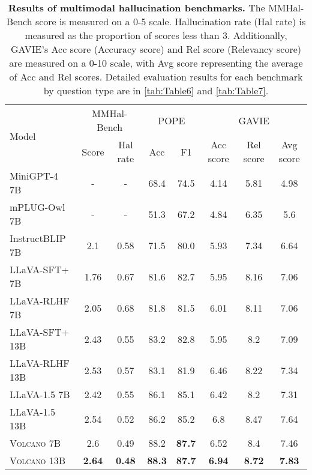 \documentclass[11pt]{article}
\newcommand{\Ours}{\textsc{Volcano}}
\begin{document}
\begin{table*}[ht]
\centering
\small
\begin{tabular}{lcc|cc|ccc}
\toprule
\multirow{2}{*}{Model} & \multicolumn{2}{c|}{MMHal-Bench} & \multicolumn{2}{c|}{POPE} & \multicolumn{3}{c}{GAVIE} \\
& Score  & Hal rate  & Acc  & F1  & Acc score  & Rel score  & Avg score  \\
\midrule
MiniGPT-4 7B & - & - & 68.4 & 74.5 & 4.14 & 5.81 & 4.98 \\
mPLUG-Owl 7B & - & - & 51.3 & 67.2 & 4.84 & 6.35 & 5.6 \\
InstructBLIP 7B & 2.1 & 0.58 & 71.5 & 80.0 & 5.93 & 7.34 & 6.64 \\
LLaVA-SFT+ 7B & 1.76 & 0.67 & 81.6 & 82.7 & 5.95 & 8.16 & 7.06 \\
LLaVA-RLHF 7B & 2.05 & 0.68 & 81.8 & 81.5 & 6.01 & 8.11 & 7.06 \\
LLaVA-SFT+ 13B & 2.43 & 0.55 & 83.2 & 82.8 & 5.95 & 8.2 & 7.09 \\
LLaVA-RLHF 13B & 2.53 & 0.57 & 83.1 & 81.9 & 6.46 & 8.22 & 7.34 \\
\midrule
LLaVA-1.5 7B & 2.42 & 0.55 & 86.1 & 85.1 & 6.42 & 8.2 & 7.31 \\
LLaVA-1.5 13B & 2.54 & 0.52 & 86.2 & 85.2 & 6.8 & 8.47 & 7.64 \\
{\Ours} 7B & 2.6 & 0.49 & 88.2 & \textbf{87.7} & 6.52 & 8.4 & 7.46 \\
{\Ours} 13B & \textbf{2.64} & \textbf{0.48} & \textbf{88.3} & \textbf{87.7} & \textbf{6.94} & \textbf{8.72} & \textbf{7.83} \\
\bottomrule
\end{tabular}
\caption{\textbf{Results of multimodal hallucination benchmarks.}   The MMHal-Bench score is measured on a 0-5 scale. Hallucination rate (Hal rate) is measured as the proportion of scores less than 3. Additionally, GAVIE's Acc score (Accuracy score) and Rel score (Relevancy score) are measured on a 0-10 scale, with Avg score representing the average of Acc and Rel scores. Detailed evaluation results for each benchmark by question type are in \autoref{tab:Table6} and \autoref{tab:Table7}.}
\label{tab:Table1}
\end{table*}
\end{document}
